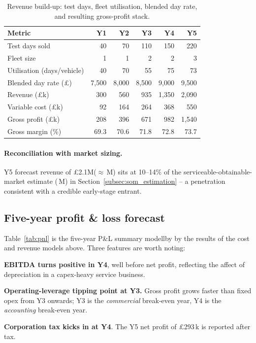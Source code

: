 \documentclass[11pt, a4paper]{report}
\numberwithin{equation}{section}
\newcommand{\yFiveRevenue}{\pounds2.1M\xspace}
\begin{document}
\begin{refsection}
\begin{table}[H]
\centering
\small
\caption{Revenue build-up: test days, fleet utilisation, blended day 
rate, and resulting gross-profit stack.}
\label{tab:revenue}
\begin{tabular}{lrrrrr}
\toprule
\textbf{Metric} & \textbf{Y1} & \textbf{Y2} & \textbf{Y3} & \textbf{Y4} & \textbf{Y5} \\
\midrule
Test days sold & 40 & 70 & 110 & 150 & 220 \\
Fleet size & 1 & 1 & 2 & 2 & 3 \\
Utilisation (days/vehicle) & 40 & 70 & 55 & 75 & 73 \\
Blended day rate (\pounds) & 7,500 & 8,000 & 8,500 & 9,000 & 9,500 \\
Revenue (\pounds k) & 300 & 560 & 935 & 1,350 & 2,090 \\
Variable cost (\pounds k) & 92 & 164 & 264 & 368 & 550 \\
Gross profit (\pounds k) & 208 & 396 & 671 & 982 & 1,540 \\
Gross margin (\%) & 69.3 & 70.6 & 71.8 & 72.8 & 73.7 \\
\bottomrule
\end{tabular}
\end{table}
\paragraph{Reconciliation with market sizing.}
Y5 forecast revenue of \yFiveRevenue ($\approx$\,M)
sits at \mbox{10--14\%} of the serviceable-obtainable-market estimate
(\,M) in Section~\ref{subsec:som_estimation} -- a
penetration consistent with a credible early-stage entrant.

\subsection{Five-year profit \& loss forecast}
\label{sec:pnl}

Table~\ref{tab:pnl} is the five-year P\&L summary modellby by the results of the cost and revenue models above. Three
features are worth noting:

\begin{tightitemize}
  \item \textbf{EBITDA turns positive in Y4}, well before net
        profit, reflecting the affect of depreciation in a
        capex-heavy service business.
  \item \textbf{Operating-leverage tipping point at Y3.} Gross
        profit grows faster than fixed opex from Y3 onwards;
        Y3 is the \emph{commercial} break-even year, Y4 is the
        \emph{accounting} break-even year.
  \item \textbf{Corporation tax kicks in at Y4}. The Y5 net profit
        of \pounds293\,k is reported after tax.
\end{tightitemize}


\end{refsection}
\end{document}

